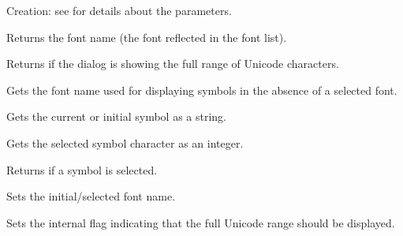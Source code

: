 Creation: see  for details about the parameters.

\label{wxsymbolpickerdialoggetfontname}


Returns the font name (the font reflected in the font list).

\label{wxsymbolpickerdialoggetfromunicode}


Returns \true if the dialog is showing the full range of Unicode characters.

\label{wxsymbolpickerdialoggetnormaltextfontname}


Gets the font name used for displaying symbols in the absence of a selected font.

\label{wxsymbolpickerdialoggetsymbol}


Gets the current or initial symbol as a string.

\label{wxsymbolpickerdialoggetsymbolchar}


Gets the selected symbol character as an integer.

\label{wxsymbolpickerdialoghasselection}


Returns \true if a symbol is selected.

\label{wxsymbolpickerdialogsetfontname}


Sets the initial/selected font name.

\label{wxsymbolpickerdialogsetfromunicode}


Sets the internal flag indicating that the full Unicode range should be displayed.

